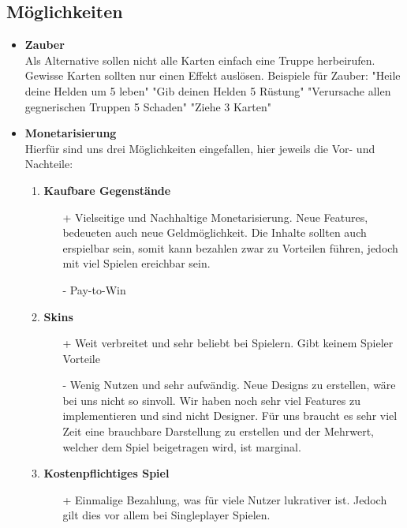 \subsection*{Möglichkeiten}
\begin{itemize}
    \item \textbf{Zauber} \\
        Als Alternative sollen nicht alle Karten einfach eine Truppe herbeirufen. Gewisse Karten sollten nur einen Effekt auslösen.
        Beispiele für Zauber:
            "Heile deine Helden um 5 leben"
            "Gib deinen Helden 5 Rüstung"
            "Verursache allen gegnerischen Truppen 5 Schaden"
            "Ziehe 3 Karten"
    \item \textbf{Monetarisierung} \\
    Hierfür sind uns drei Möglichkeiten eingefallen, hier jeweils die Vor- und Nachteile:
    \begin{enumerate}
        \item \textbf{Kaufbare Gegenstände}
        \begin{itemize}
            \item[+] Vielseitige und Nachhaltige Monetarisierung. Neue Features, bedeueten auch neue Geldmöglichkeit. Die Inhalte sollten
                     auch erspielbar sein, somit kann bezahlen zwar zu Vorteilen führen, jedoch mit viel Spielen ereichbar sein.
            \item[-] Pay-to-Win
        \end{itemize}
        \item \textbf{Skins}
        \begin{itemize}
            \item[+] Weit verbreitet und sehr beliebt bei Spielern. Gibt keinem Spieler Vorteile
            \item[-] Wenig Nutzen und sehr aufwändig. Neue Designs zu erstellen, wäre bei uns nicht so sinvoll.
                     Wir haben noch sehr viel Features zu implementieren und sind nicht Designer. Für uns braucht es sehr
                     viel Zeit eine brauchbare Darstellung zu erstellen und der Mehrwert, welcher dem Spiel beigetragen wird, ist marginal.
        \end{itemize}
        \item \textbf{Kostenpflichtiges Spiel}
        \begin{itemize}
            \item[+] Einmalige Bezahlung, was für viele Nutzer lukrativer ist. Jedoch gilt dies vor allem bei Singleplayer Spielen.

\end{itemize}
\end{enumerate}
\end{itemize}
